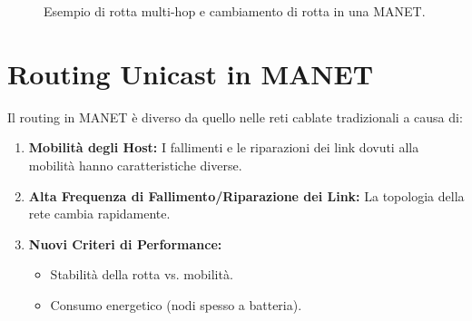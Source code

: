 \begin{figure}[H]
    \centering
    \caption{Esempio di rotta multi-hop e cambiamento di rotta in una MANET.}
    \label{fig:manet_multihop}
\end{figure}

\section{Routing Unicast in MANET}
Il routing in MANET è diverso da quello nelle reti cablate tradizionali a causa di:
\begin{enumerate}
    \item \textbf{Mobilità degli Host:} I fallimenti e le riparazioni dei link dovuti alla mobilità hanno caratteristiche diverse.
    \item \textbf{Alta Frequenza di Fallimento/Riparazione dei Link:} La topologia della rete cambia rapidamente.
    \item \textbf{Nuovi Criteri di Performance:}
    \begin{itemize}
        \item Stabilità della rotta vs. mobilità.
        \item Consumo energetico (nodi spesso a batteria).
    \end{itemize}
\end{enumerate}


